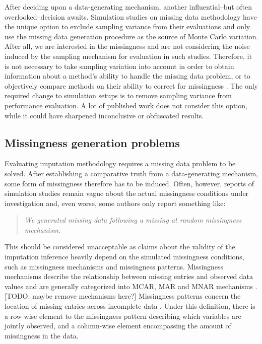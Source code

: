 \documentclass[bimj,fleqn]{w-art}
\begin{document}
After deciding upon a data-generating mechanism, another influential--but often overlooked--decision awaits. Simulation studies on missing data methodology have the unique option to exclude sampling variance from their evaluations and only use the missing data generation procedure as the source of Monte Carlo variation. After all, we are interested in the missingness and are not considering the noise induced by the sampling mechanism for evaluation in such studies. Therefore, it is not necessary to take sampling variation into account in order to obtain information about a method's ability to handle the missing data problem, or to objectively compare methods on their ability to correct for missingness \citep[see for a detailed discussion][]{vink14}. The only required change to simulation setups is to remove sampling variance from performance evaluation. A lot of published work does not consider this option, while it could have sharpened inconclusive or obfuscated results.  




\subsection{Missingness generation problems}

Evaluating imputation methodology requires a missing data problem to be solved. After establishing a comparative truth from a data-generating mechanism, some form of missingness therefore has to be induced. Often, however, reports of simulation studies remain vague about the actual missingness conditions under investigation and, even worse, some authors only report something like:
\begin{quote}
\textit{We generated missing data following a missing at random missingness mechanism.}
\end{quote}
This should be considered unacceptable as claims about the validity of the imputation inference heavily depend on the simulated missingness conditions, such as missingness mechanisms and missingness patterns. Missingness mechanisms describe the relationship between missing entries and observed data values and are generally categorized into MCAR, MAR and MNAR mechanisms \citep[][see Table \ref{table:mech}]{rubi76}. [TODO: maybe remove mechanisms here?] Missingness patterns concern the location of missing entries across incomplete data \citep[][p. 8]{litt20}. Under this definition, there is a row-wise element to the missingness pattern describing which variables are jointly observed, and a column-wise element encompassing the amount of missingness in the data. 
\end{document}
